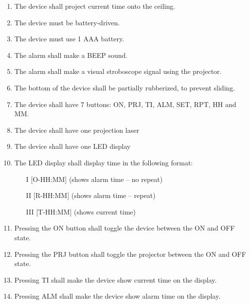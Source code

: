 \documentclass[Main_Assignment2]{subfiles}
\begin{document}
\begin{enumerate}[label=RE\arabic*:]
	\item 
	The device shall project current time onto the ceiling.
	
	\item 
	The device must be battery-driven.

	\item
	The device must use 1 AAA battery.

	\item
	The alarm shall make a BEEP sound.

	\item 
	The alarm shall make a visual stroboscope signal using the projector.

	\item
	The bottom of the device shall be partially rubberized, to prevent sliding.

	\item
	The device shall have 7 buttons: ON, PRJ, TI, ALM, SET, RPT, HH and MM.

	\item
	The device shall have one projection laser

	\item
	The device shall have one LED display

	\item
	The LED display shall display time in the following format:

	\begin{itemize}
		\item [I] [O-HH:MM] (shows alarm time – no repeat)
		\item [II] [R-HH:MM] (shows alarm time – repeat)
		\item [III] [T-HH:MM] (shows current time)

	\end{itemize}

	\item
	Pressing the ON button shall toggle the device between the ON and OFF state.

	\item
	Pressing the PRJ button shall toggle the projector between the ON and OFF state.	

	\item
	Pressing TI shall make the device show current time on the display.

	\item
	Pressing ALM shall make the device show alarm time on the display.


\end{enumerate}
\end{document}
